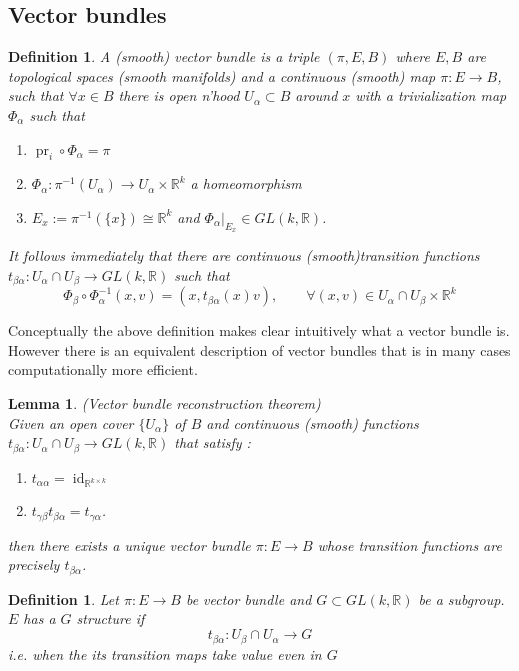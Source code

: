 \documentclass{article}
\numberwithin{theorem}{section}
\newtheorem{lemma}[theorem]{Lemma}
\newtheorem{definition}[theorem]{Definition}
\newcommand{\R}{\mathbb{R}}
\newcommand{\1}{\mathds{1}}
\DeclareMathOperator{\pr}{pr}
\DeclareMathOperator{\id}{id}
\begin{document}
\subsection{Vector bundles}
\begin{definition}
    A (smooth) vector bundle is a triple $(\pi, E, B) $ where  $E,B$ are topological spaces (smooth manifolds) and a continuous (smooth) map $\pi: E \to B$, such that $\forall x \in B$ there is open n'hood $U_\alpha \subset B$ around $x$ with a trivialization map $\Phi_\alpha $ such that 
    \begin{enumerate}
        \item $\pr_i \circ \Phi_\alpha = \pi $ 
        \item $\Phi_\alpha : \pi^{-1}(U_\alpha) \to U_\alpha \times \R^k $ a homeomorphism
        \item $E_x := \pi^{-1}(\{x\}) \cong \R^k$ and $\Phi_\alpha |_{E_x} \in GL(k, \R) $. 
    \end{enumerate}
    It follows immediately that there are continuous (smooth)transition functions $t_{\beta \alpha} : U_\alpha \cap U_\beta \to GL(k, \R) $ such that 
    \[ \Phi_\beta \circ \Phi_\alpha^{-1} (x,v) = (x, t_{\beta \alpha}(x) v ), \qquad \forall (x,v) \in U_\alpha \cap U_\beta \times \R^k \]
\end{definition}
Conceptually the above definition makes clear intuitively what a vector bundle is. However there is an equivalent description of vector bundles that is in many cases computationally more efficient. 
\begin{lemma}(Vector bundle reconstruction theorem)\\
    Given an open cover $\{ U_\alpha \}$ of $B$ and continuous (smooth) functions $t_{\beta \alpha} : U_\alpha \cap U_\beta \to GL(k, \R) $ that satisfy : 
    \begin{enumerate}
        \item $t_{\alpha \alpha } = \id_{\R^{k\times k}}  $
        \item $t_{\gamma \beta } t_{\beta \alpha}  = t_{\gamma \alpha} $. 
    \end{enumerate}
    then there exists a unique vector bundle $\pi: E \to B$ whose transition functions are precisely $t_{\beta \alpha}$. 
\end{lemma}

\begin{definition}
    Let $\pi: E \to B$ be vector bundle and $G \subset GL(k, \R)$ be a subgroup. $E$ has a $G$ structure if 
    \[ t_{\beta \alpha} : U_\beta \cap U_\alpha \to G \]
    i.e. when the its transition maps take value even in $G$
\end{definition}
\end{document}
